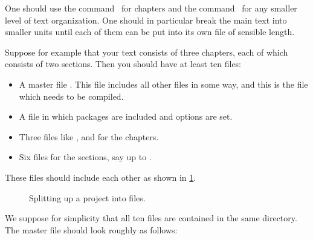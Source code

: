 One should use the command~ for chapters and the command~ for any smaller level of text organization.
One should in particular break the main text into smaller units until each of them can be put into its own file of sensible length.

Suppose for example that your text consists of three chapters, each of which consists of two sections.
Then you should have at least ten files:
\begin{itemize}
  \item
    A master file .
    This file includes all other files in some way, and this is the file which needs to be compiled.
  \item
    A file  in which packages are included and options are set.
  \item
    Three files like ,  and  for the chapters.
  \item
    Six files for the sections, say  up to .
\end{itemize}
These files should include each other as shown in \cref{file inclusion structure}.
\begin{figure}[tb]
  \begin{center}
  \end{center}
  \caption{Splitting up a project into files.}
  \label{file inclusion structure}
\end{figure}
We suppose for simplicity that all ten files are contained in the same directory.
The master file  should look roughly as follows:
%
